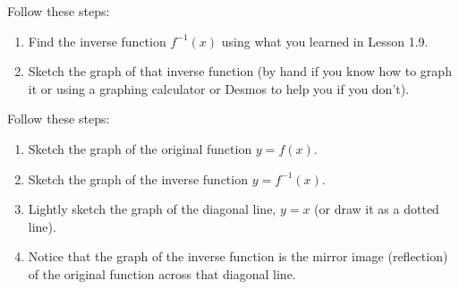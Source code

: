 \documentclass[fleqn,letterpaper,12pt,printwatermark=false]{memoir}
\begin{document}
\begin{myKeyConcepts}
    Follow these steps:
    \begin{enumerate}
        \item Find the inverse function $f^{-1}(x)$ using what you learned in Lesson 1.9.
        \item Sketch the graph of that inverse function 
        (by hand if you know how to graph it or using a graphing calculator or Desmos to help you if you don't).
    \end{enumerate}
\end{myKeyConcepts}




\begin{myKeyConcepts}
    Follow these steps:
    \begin{enumerate}
        \item Sketch the graph of the original function $y = f(x)$.
        \item Sketch the graph of the inverse function $y = f^{-1}(x)$.
        \item Lightly sketch the graph of the diagonal line, $y=x$ (or draw it as a dotted line).
        \item Notice that the graph of the inverse function 
        is the mirror image (reflection) of the original function 
        across that diagonal line.
    \end{enumerate}
\end{myKeyConcepts}
\end{document}
